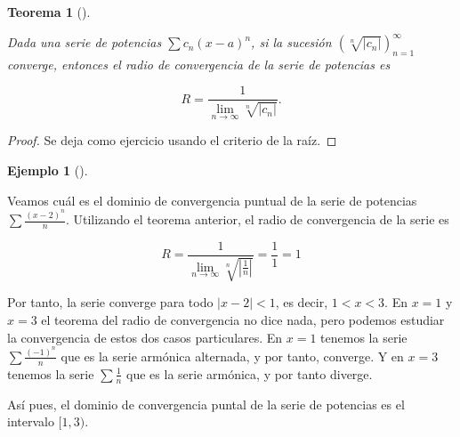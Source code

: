 \documentclass[
  a4paper,
]{scrreport}
\theoremstyle{definition}
\newtheorem{example}{Ejemplo}[chapter]
\theoremstyle{plain}
\theoremstyle{definition}
\theoremstyle{definition}
\theoremstyle{plain}
\newtheorem{theorem}{Teorema}[chapter]
\theoremstyle{plain}
\theoremstyle{remark}
\begin{document}
\begin{theorem}[]\protect\hypertarget{thm-radio-convergencia-raiz}{}\label{thm-radio-convergencia-raiz}

Dada una serie de potencias \(\sum c_n(x-a)^n\), si la sucesión
\((\sqrt[n]{|c_n|})_{n=1}^\infty\) converge, entonces el radio de
convergencia de la serie de potencias es

\[
R=\frac{1}{\lim_{n\to\infty} \sqrt[n]{|c_n|}}.
\]

\end{theorem}

\begin{tcolorbox}[enhanced jigsaw, leftrule=.75mm, colbacktitle=quarto-callout-note-color!10!white, toprule=.15mm, opacityback=0, opacitybacktitle=0.6, toptitle=1mm, breakable, bottomtitle=1mm, colframe=quarto-callout-note-color-frame, rightrule=.15mm, titlerule=0mm, title=\textcolor{quarto-callout-note-color}{\faInfo}\hspace{0.5em}{Demostración}, arc=.35mm, left=2mm, bottomrule=.15mm, colback=white, coltitle=black]

\begin{proof}
Se deja como ejercicio usando el criterio de la raíz.
\end{proof}

\end{tcolorbox}

\begin{example}[]\protect\hypertarget{exm-radio-convergencia-raiz}{}\label{exm-radio-convergencia-raiz}

Veamos cuál es el dominio de convergencia puntual de la serie de
potencias \(\sum \frac{(x-2)^n}{n}\). Utilizando el teorema anterior, el
radio de convergencia de la serie es

\[
R= \frac{1}{\lim_{n\to\infty} \sqrt[n]{|\frac{1}{n}|}} = \frac{1}{1} = 1
\]

Por tanto, la serie converge para todo \(|x-2|<1\), es decir, \(1<x<3\).
En \(x=1\) y \(x=3\) el teorema del radio de convergencia no dice nada,
pero podemos estudiar la convergencia de estos dos casos particulares.
En \(x=1\) tenemos la serie \(\sum \frac{(-1)^n}{n}\) que es la serie
armónica alternada, y por tanto, converge. Y en \(x=3\) tenemos la serie
\(\sum \frac{1}{n}\) que es la serie armónica, y por tanto diverge.

Así pues, el dominio de convergencia puntal de la serie de potencias es
el intervalo \([1,3)\).

\end{example}
\end{document}
